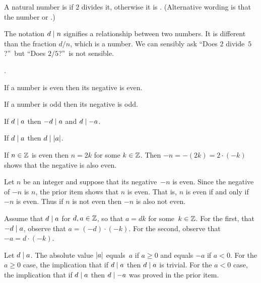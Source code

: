 \documentclass{ibl}
\begin{document}
\begin{df}
  A natural number is  if $2$ divides it,
  otherwise it is .
  (Alternative wording is that the number 
  or .)
\end{df}

The notation $d\mid n$ signifies a relationship between two numbers.
It is different than the fraction $d/n$, which is a number.
We can sensibly ask ``Does $2$ divide~$5$?''\
but ``Does $2/5$?''\ is not sensible.   

\begin{ex} 
\label{ex:InteractionOfParityWithSign}
\pord.
\begin{exes}
\item If a number is even then its negative is even.
\item If a number is odd then its negative is odd.
\item If $d\mid a$ then $-d\mid a$ and $d\mid -a$.
\item If $d\mid a$ then $d\mid\lvert a\rvert$.
\end{exes}  
\begin{ans}
\begin{exes}
\item If $n\in\mathbb{Z}$ is even then $n=2k$ for some $k\in\mathbb{Z}$.
Then $-n=-(2k)=2\cdot(-k)$ shows that the negative is also even.
\item Let $n$ be an integer and suppose that its negative~$-n$ is even.
Since the negative of $-n$ is $n$, the prior item shows that $n$ is even.
That is, $n$ is even if and only if $-n$ is even.
Thus if $n$ is not even then $-n$ is also not even.
\item Assume that $d\mid a$ for $d,a\in\mathbb{Z}$, so that 
$a=dk$ for some~$k\in\mathbb{Z}$.
For the first, that $-d\mid a$, observe that
$a=(-d)\cdot(-k)$.
For the second, observe that $-a=d\cdot(-k)$.
\item Let $d\mid a$.
The absolute value $\lvert a\rvert$ equals~$a$ if $a\geq 0$ and equals
$-a$ if $a<0$.
For the $a\geq 0$ case, the implication that if $d\mid a$ then $d\mid a$
is trivial.
For the $a<0$ case, 
the implication that if $d\mid a$ then $d\mid -a$ was
proved in the prior item.
\end{exes}
\end{ans}
\end{ex}
\end{document}
